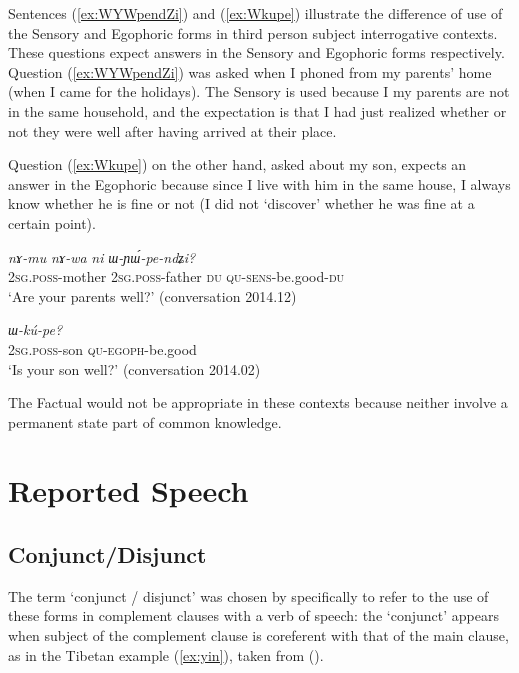 \documentclass[oldfontcommands,oneside,a4paper,11pt]{article}
\newcommand{\ipa}[1]{{\phon\textit{#1}}} %
\newcommand{\refb}[1]{(\ref{#1})}
\begin{document}
Sentences \refb{ex:WYWpendZi} and \refb{ex:Wkupe} illustrate the difference of use of the Sensory and Egophoric forms in third person subject interrogative contexts. These questions expect answers in the Sensory and Egophoric forms respectively. Question \refb{ex:WYWpendZi} was asked when I phoned from my parents' home (when I came for the holidays). The Sensory is used because I my parents are not in the same household, and the expectation is that I had just realized whether or not they were well after having arrived at their place. 

Question \refb{ex:Wkupe} on the other hand, asked about my son, expects an answer in the Egophoric because since I live with him in the same house, I always know whether he is fine or not (I did not `discover' whether he was fine at a certain point).

\begin{exe}
\ex \label{ex:WYWpendZi}
\gll 
\ipa{nɤ-mu}  	\ipa{nɤ-wa}  	\ipa{ni}  	\ipa{ɯ-ɲɯ́-pe-ndʑi?}  \\
\textsc{2sg.poss}-mother \textsc{2sg.poss}-father \textsc{du} \textsc{qu-sens}-be.good-\textsc{du} \\
\glt `Are your parents well?' (conversation 2014.12)
\end{exe}


\begin{exe}
\ex \label{ex:Wkupe}
\gll \ipa{nɤ-tɕɯ} \ipa{ɯ-kú-pe?}\\
\textsc{2sg.poss}-son \textsc{qu-egoph}-be.good\\
\glt `Is your son well?' (conversation 2014.02)
\end{exe}

The Factual would not be appropriate in these contexts because neither involve a permanent state part of common knowledge.


\section{Reported Speech} \label{sec:hybrid}

\subsection{Conjunct/Disjunct}
 The term `conjunct / disjunct' was chosen by  \citet{hale80conjunct} specifically to refer to the use of these forms in complement clauses with a verb of speech: the `conjunct' appears when  subject of the complement clause is coreferent with that of the main clause, as in the Tibetan example \refb{ex:yin}, taken from (\citealt[295]{delancey90erg}).
\end{document}
